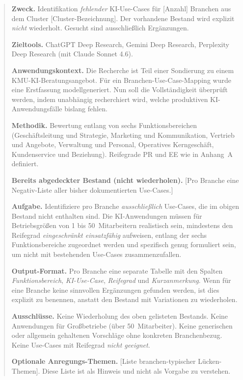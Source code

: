 \documentclass[a4paper,11pt]{article}
\begin{document}
\begin{quote}\small
\textbf{Zweck.} Identifikation \emph{fehlender} KI-Use-Cases für
[Anzahl] Branchen aus dem Cluster [Cluster-Bezeichnung]. Der vorhandene
Bestand wird explizit \emph{nicht} wiederholt. Gesucht sind
ausschließlich Ergänzungen.

\textbf{Zieltools.} ChatGPT Deep Research, Gemini Deep Research,
Perplexity Deep Research (mit Claude Sonnet 4.6).

\textbf{Anwendungskontext.} Die Recherche ist Teil einer Sondierung
zu einem KMU-KI-Beratungsangebot. Für ein Branchen-Use-Case-Mapping
wurde eine Erstfassung modell\-generiert. Nun soll die Vollständigkeit
überprüft werden, indem unabhängig recherchiert wird, welche
produktiven KI-Anwendungsfälle bislang fehlen.

\textbf{Methodik.} Bewertung entlang von sechs Funktionsbereichen
(Geschäftsleitung und Strategie, Marketing und Kommunikation, Vertrieb
und Angebote, Verwaltung und Personal, Operatives Kerngeschäft,
Kundenservice und Beziehung). Reifegrade PR und EE wie in Anhang~A
definiert.

\textbf{Bereits abgedeckter Bestand (nicht wiederholen).}
[Pro Branche eine Negativ-Liste aller bisher dokumentierten
Use-Cases.]

\textbf{Aufgabe.} Identifiziere pro Branche \emph{ausschließlich}
Use-Cases, die im obigen Bestand nicht enthalten sind. Die
KI-Anwendungen müssen für Betriebsgrößen von 1 bis 50~Mitarbeitern
realistisch sein, mindestens den Reifegrad \emph{eingeschränkt
einsatzfähig} aufweisen, entlang der sechs Funktionsbereiche
zugeordnet werden und spezifisch genug formuliert sein, um nicht mit
bestehenden Use-Cases zusammenzufallen.

\textbf{Output-Format.} Pro Branche eine separate Tabelle mit den
Spalten \emph{Funktionsbereich}, \emph{KI-Use-Case}, \emph{Reifegrad}
und \emph{Kurzanmerkung}. Wenn für eine Branche keine sinnvollen
Ergänzungen gefunden werden, ist dies explizit zu benennen, anstatt
den Bestand mit Variationen zu wiederholen.

\textbf{Ausschlüsse.} Keine Wiederholung des oben gelisteten Bestands.
Keine Anwendungen für Großbetriebe (über 50~Mitarbeiter). Keine
generischen oder allgemein gehaltenen Vorschläge ohne konkreten
Branchenbezug. Keine Use-Cases mit Reifegrad \emph{nicht geeignet}.

\textbf{Optionale Anregungs-Themen.} [Liste branchen-typischer
Lücken-Themen]. Diese Liste ist als Hinweis und nicht als Vorgabe zu
verstehen.
\end{quote}

\newpage

\printbibliography
{}
\end{document}
